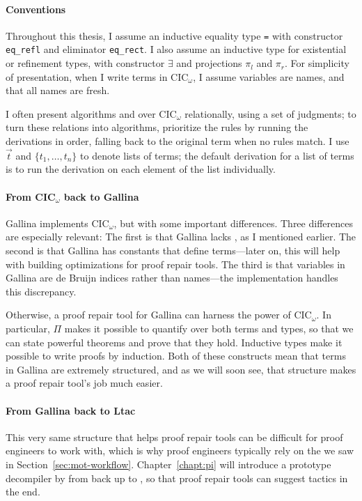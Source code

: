 \paragraph{Conventions}
Throughout this thesis, I assume an inductive  equality type \lstinline{=} with constructor \lstinline{eq_refl}
and eliminator \lstinline{eq_rect}.
I also assume an inductive type \intro{$\Sigma$} for existential or refinement types,
with constructor $\exists$ and projections $\pi_l$ and $\pi_r$.
For simplicity of presentation, when I write terms in CIC$_{\omega}$, I assume variables are names, and that all names are fresh.

I often present  algorithms and  over CIC$_{\omega}$ relationally, using a set of judgments; %
to turn these relations into algorithms, prioritize the rules by running the derivations in
order, falling back to the original term when no rules match.
I use $\vec{t}$ and $\{t_1, \ldots, t_n\}$ to denote lists of terms;
the default derivation for a list of terms is to run the derivation on each element of the list individually. 

\paragraph{From CIC$_{\omega}$ back to Gallina}
Gallina implements CIC$_{\omega}$, but with some important differences.
Three differences are especially relevant:
The first is that Gallina lacks , as I mentioned earlier.
The second is that Gallina has constants that define terms---later on, this will help with building optimizations for proof repair tools.
The third is that variables in Gallina are de Bruijn indices rather than names---the implementation handles this discrepancy.

Otherwise, a proof repair tool for Gallina can harness the power of CIC$_{\omega}$.
In particular, $\Pi$ makes it possible to quantify over both terms and types,
so that we can state powerful theorems and prove that they hold.
Inductive types make it possible to write proofs by induction.
Both of these constructs mean that terms in Gallina are extremely structured,
and as we will soon see, that structure makes a proof repair tool's job much easier.

\paragraph{From Gallina back to Ltac}
This very same structure that helps proof repair tools can be difficult for proof engineers to work with,
which is why proof engineers typically rely on the   we saw in Section~\ref{sec:mot-workflow}.
Chapter~\ref{chapt:pi} will introduce a prototype decompiler by  from  back up to ,
so that proof repair tools can suggest tactics in the end.

